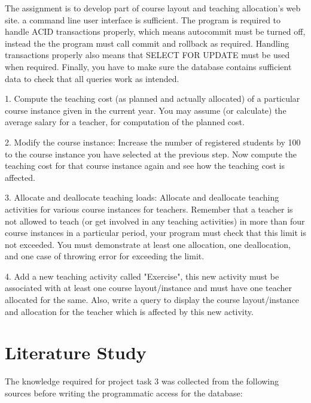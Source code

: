 \documentclass[a4paper]{scrartcl}
\renewcommand{\_}{\textunderscore\allowbreak}
\begin{document}
The assignment is to develop part of course layout and teaching allocation's web site. a command line user interface is sufficient. The program is required to handle ACID transactions properly, which means autocommit must be turned off, instead the the program must call commit and rollback as required. Handling transactions properly also means that SELECT FOR UPDATE must be used when required.
Finally, you have to make sure the database contains sufficient data to check that all queries work as intended.

1. Compute the teaching cost (as planned and actually allocated) of a particular course
instance given in the current year. You may assume (or calculate) the average salary for a
teacher, for computation of the planned cost.

2. Modify the course instance: Increase the number of registered students by 100 to the
course instance you have selected at the previous step. Now compute the teaching cost for that
course instance again and see how the teaching cost is affected.

3. Allocate and deallocate teaching loads: Allocate and deallocate teaching activities for
various course instances for teachers. Remember that a teacher is not allowed to teach (or get involved in any teaching activities) in more than four course instances in a particular period, your program must check that this limit is not exceeded. You must demonstrate at least one allocation, one deallocation, and one case of throwing error for exceeding the limit.

4. Add a new teaching activity called "Exercise", this new activity must be associated with
at least one course layout/instance and must have one teacher allocated for the same. Also,
write a query to display the course layout/instance and allocation for the teacher which is
affected by this new activity.

\section{Literature Study}


The knowledge required for project task 3 was collected from the following sources before writing the programmatic access for the database:
\end{document}
